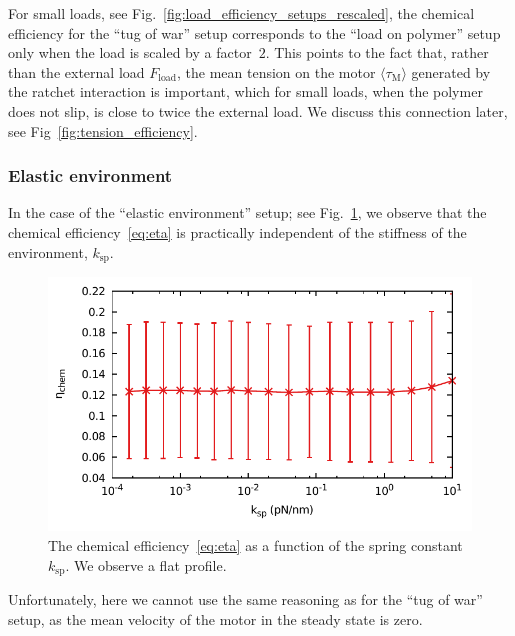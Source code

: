 \documentclass[aps,pre,twocolumn,showpacs,showkeys,superscriptaddress,floatfix]{revtex4-1}
\begin{document}
For small loads, see Fig.~\ref{fig:load_efficiency_setups_rescaled}, the chemical efficiency for the ``tug of war'' setup corresponds to the ``load on polymer'' setup only when the load is scaled by a factor~$2$. 
This points to the fact that, rather than the external load $F_\text{load}$, the mean tension on the motor $\langle \tau_\text{M} \rangle$ generated by the ratchet interaction is important,
which for small loads, when the polymer does not slip, is close to twice the external load. 
We discuss this connection later, see Fig~\ref{fig:tension_efficiency}. 


\subsubsection{Elastic environment}
In the case of the  ``elastic environment'' setup; see Fig.~\ref{fig:stiffness_efficiency}, we observe that the chemical efficiency~\eqref{eq:eta} is practically independent of the stiffness of the environment, $k_\text{sp}$. 
\begin{figure}[t]
\centering
\includegraphics[width=.9\linewidth,height=!]{k_eta.pdf}
\caption{\label{fig:stiffness_efficiency}
The chemical efficiency~\eqref{eq:eta} as a function of the spring constant $k_\text{sp}$.
We observe a flat profile.
}
\end{figure}
Unfortunately, here we cannot use the same reasoning as for the ``tug of war'' setup, as the mean velocity of the motor in the steady state is zero. 
\end{document}
